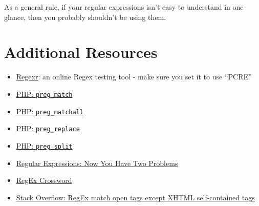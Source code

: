 As a general rule, if your regular expressions isn't easy to understand in one glance, then you probably shouldn't be using them.



\section{Additional Resources}

\begin{itemize}[leftmargin=*]
    \item \href{https://regexr.com}{Regexr}: an online Regex testing tool - make sure you set it to use ``PCRE''
    \item \href{http://www.php.net/manual/en/function.preg-match.php}{PHP: \texttt{preg\_match}}
    \item \href{http://www.php.net/manual/en/function.preg-match-all.php}{PHP: \texttt{preg\_matchall}}
    \item \href{http://www.php.net/manual/en/function.preg-replace.php}{PHP: \texttt{preg\_replace}}
    \item \href{http://www.php.net/manual/en/function.preg-split.php}{PHP: \texttt{preg\_split}}
    \item \href{https://blog.codinghorror.com/regular-expressions-now-you-have-two-problems/}{Regular Expressions: Now You Have Two Problems}
    \item \href{http://www.regexcrossword.com/}{RegEx Crossword}
    \item \href{https://stackoverflow.com/a/1732454}{Stack Overflow: RegEx match open tags except XHTML self-contained tags}
\end{itemize}
